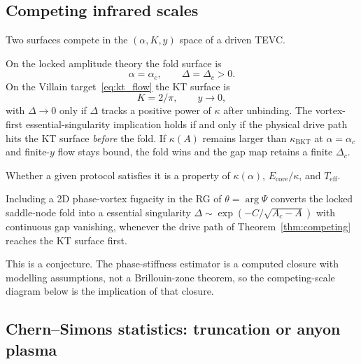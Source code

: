 \subsection{Competing infrared scales}
\label{sec:competing}

Two surfaces compete in the $(\alpha,K,y)$ space of a driven TEVC.

\begin{theorem}
\label{thm:competing}
On the locked amplitude theory the fold surface is
\begin{equation}
\alpha=\alpha_c,\qquad \Delta=\Delta_c>0.
\label{eq:fold_surface}
\end{equation}
On the Villain target~\eqref{eq:kt_flow} the KT surface is
\begin{equation}
K=2/\pi,\qquad y\to 0,
\label{eq:kt_surface}
\end{equation}
with $\Delta\to 0$ only if $\Delta$ tracks a positive power of $\kappa$ after unbinding. The vortex-first essential-singularity implication holds if and only if the physical drive path hits the KT surface \emph{before} the fold. If $\kappa(A)$ remains larger than $\kappa_{\mathrm{BKT}}$ at $\alpha=\alpha_c$ and finite-$y$ flow stays bound, the fold wins and the gap map retains a finite $\Delta_c$.
\end{theorem}

Whether a given protocol satisfies it is a property of $\kappa(\alpha)$, $E_{\mathrm{core}}/\kappa$, and $T_{\mathrm{eff}}$.

\begin{hypothesis}
Including a 2D phase-vortex fugacity in the RG of $\theta=\arg\Psi$ converts the locked saddle-node fold into a \textup{\BKT{}} essential singularity $\Delta\sim\exp(-C/\sqrt{A_c-A})$ with continuous gap vanishing, whenever the drive path of Theorem~\ref{thm:competing} reaches the KT surface first.
\end{hypothesis}

This is a conjecture. The phase-stiffness estimator is a computed closure with modelling assumptions, not a Brillouin-zone theorem, so the competing-scale diagram below is the implication of that closure.

\subsection{Chern--Simons statistics: truncation or anyon plasma}
\label{sec:anyon}

